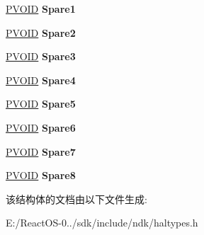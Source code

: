 \begin{DoxyCompactItemize}
\mbox{\label{struct___b_u_s___h_a_n_d_l_e_r_a2f0a2cc42befa904189c705038925c32}} 
\hyperlink{interfacevoid}{P\+V\+O\+ID} {\bfseries Spare1}
\item 
\mbox{\label{struct___b_u_s___h_a_n_d_l_e_r_a5c03726a6ace24b8d6bfdfce4245770a}} 
\hyperlink{interfacevoid}{P\+V\+O\+ID} {\bfseries Spare2}
\item 
\mbox{\label{struct___b_u_s___h_a_n_d_l_e_r_ae635e5c68c973f406decc6161e6c4479}} 
\hyperlink{interfacevoid}{P\+V\+O\+ID} {\bfseries Spare3}
\item 
\mbox{\label{struct___b_u_s___h_a_n_d_l_e_r_a0acae01fd95869480a652b86ffca6dca}} 
\hyperlink{interfacevoid}{P\+V\+O\+ID} {\bfseries Spare4}
\item 
\mbox{\label{struct___b_u_s___h_a_n_d_l_e_r_a458a78334fd3c16fdccd70d5c8930f29}} 
\hyperlink{interfacevoid}{P\+V\+O\+ID} {\bfseries Spare5}
\item 
\mbox{\label{struct___b_u_s___h_a_n_d_l_e_r_a94972cb84817b4a8402c5978b88b3a83}} 
\hyperlink{interfacevoid}{P\+V\+O\+ID} {\bfseries Spare6}
\item 
\mbox{\label{struct___b_u_s___h_a_n_d_l_e_r_a41d1fee9d154d81f00c9ef926e27aa89}} 
\hyperlink{interfacevoid}{P\+V\+O\+ID} {\bfseries Spare7}
\item 
\mbox{\label{struct___b_u_s___h_a_n_d_l_e_r_a5269410d2b965d38ae37004be7b44c5b}} 
\hyperlink{interfacevoid}{P\+V\+O\+ID} {\bfseries Spare8}
\end{DoxyCompactItemize}


该结构体的文档由以下文件生成\+:\begin{DoxyCompactItemize}
\item 
E\+:/\+React\+O\+S-\/0../sdk/include/ndk/haltypes.\+h\end{DoxyCompactItemize}
